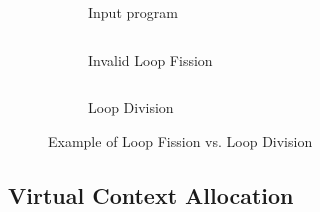 \begin{figure}
\centering
\begin{subfigure}[b]{0.28\textwidth}
\inputminted{python}{code/loopexp2.py}
\caption{Input program}
\end{subfigure}
\hfill
\begin{subfigure}[b]{0.32\textwidth}
\inputminted{python}{code/loopexp2fission.py}
\caption{Invalid Loop Fission}
\end{subfigure}
\hfill
\begin{subfigure}[b]{0.31\textwidth}
\inputminted{python}{code/loopexp2division.py}
\caption{Loop Division}
\end{subfigure}
\caption[Example of Loop Fission vs. Loop Division]{
Example of Loop Fission vs. Loop Division
}
\label{fig:loopexp2}
\end{figure}

\subsection{Virtual Context Allocation} 

